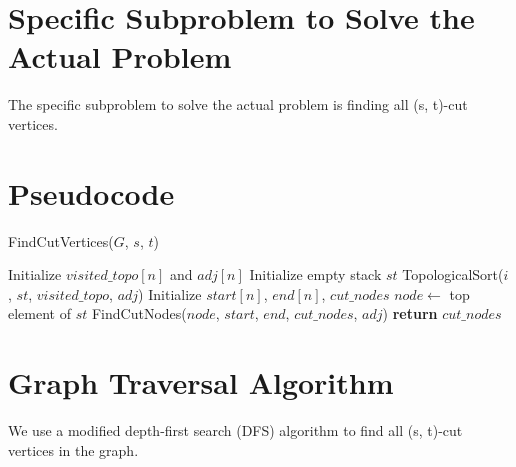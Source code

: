 \documentclass{article}
\begin{document}
\section{Specific Subproblem to Solve the Actual Problem}
    The specific subproblem to solve the actual problem is finding all (s, t)-cut vertices.
    
\section{Pseudocode}
    \begin{algorithm}
        \caption{FindCutVertices($G$, $s$, $t$)}
        \begin{algorithmic}[1]
            \State Initialize $visited\_topo[n]$ and $adj[n]$
            \State Initialize empty stack $st$
                        \State TopologicalSort($i$, $st$, $visited\_topo$, $adj$)
                    \EndIf
                \EndFor
                \State Initialize $start[n]$, $end[n]$, $cut\_nodes$
                    \State $node \gets$ top element of $st$
                        \State FindCutNodes($node$, $start$, $end$, $cut\_nodes$, $adj$)
                    \EndIf
                \EndWhile
                \State \textbf{return} $cut\_nodes$
        \end{algorithmic}
    \end{algorithm}

\section{Graph Traversal Algorithm}
    We use a modified depth-first search (DFS) algorithm to find all (s, t)-cut vertices in the graph.
\end{document}
